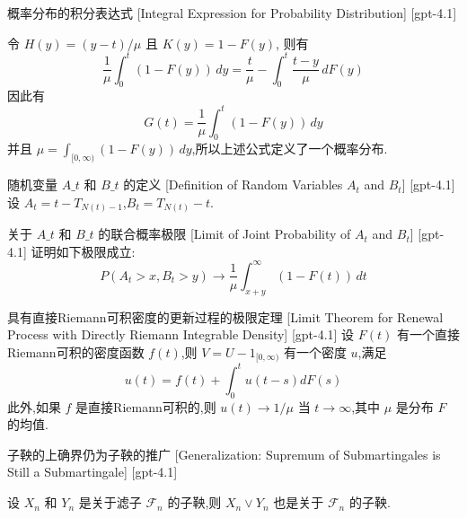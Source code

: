 \documentclass[UTF8]{ctexart}
\begin{document}
    
    
    \begin{ppt}
        {概率分布的积分表达式}
        [Integral Expression for Probability Distribution]
        [gpt-4.1]
        
令 $H(y) = (y-t)/\mu$ 且 $K(y) = 1 - F(y)$, 则有
\[
\frac{1}{\mu} \int_0^t (1-F(y))\,dy = \frac{t}{\mu} - \int_0^t \frac{t-y}{\mu}\,dF(y)
\]
因此有
\[
G(t) = \frac{1}{\mu} \int_0^t (1-F(y))\,dy
\]
并且 $\mu = \int_{[0,\infty)} (1-F(y))\,dy$,所以上述公式定义了一个概率分布.

    \end{ppt}
    
    
    
    \begin{dfn}
        {随机变量 $A\_{t}$ 和 $B\_{t}$ 的定义}
        [Definition of Random Variables $A_{t}$ and $B_{t}$]
        [gpt-4.1]
        设 $A_{t} = t - T_{N(t) - 1}$,$B_{t} = T_{N(t)} - t$.
    \end{dfn}
    
    
    
    \begin{thm}
        {关于 $A\_{t}$ 和 $B\_{t}$ 的联合概率极限}
        [Limit of Joint Probability of $A_{t}$ and $B_{t}$]
        [gpt-4.1]
        证明如下极限成立:
\[
P(A_{t} > x, B_{t} > y) \to \frac{1}{\mu} \int_{x + y}^{\infty} (1 - F(t))\, dt
\]

    \end{thm}
    
    
    
    \begin{thm}
        {具有直接Riemann可积密度的更新过程的极限定理}
        [Limit Theorem for Renewal Process with Directly Riemann Integrable Density]
        [gpt-4.1]
        设 $F(t)$ 有一个直接Riemann可积的密度函数 $f(t)$,则 $V=U-1_{[0,\infty)}$ 有一个密度 $
u$,满足
\[
u(t) = f(t) + \int_{0}^{t} 
u(t - s) dF(s)
\]
此外,如果 $f$ 是直接Riemann可积的,则 $
u(t) \to 1/\mu$ 当 $t \to \infty$,其中 $\mu$ 是分布 $F$ 的均值.
    \end{thm}
    
    
    
    \begin{thm}
        {子鞅的上确界仍为子鞅的推广}
        [Generalization: Supremum of Submartingales is Still a Submartingale]
        [gpt-4.1]
        
设 $X_n$ 和 $Y_n$ 是关于滤子 ${\mathcal{F}}_n$ 的子鞅,则 $X_n \lor Y_n$ 也是关于 ${\mathcal{F}}_n$ 的子鞅.

    \end{thm}
    
\end{document}
